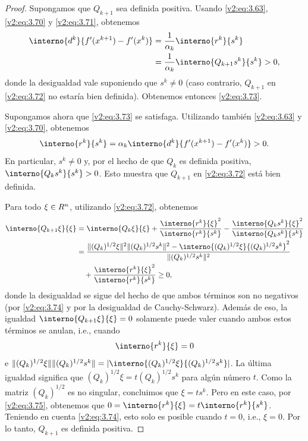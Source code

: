 \begin{proof}
    Supongamos que $Q_{k+1}$ sea definida positiva. Usando \eqref{v2:eq:3.63}, \eqref{v2:eq:3.70} y \eqref{v2:eq:3.71}, obtenemos
    \begin{align*}
        \interno{d^k}{f'(x^{k+1}) - f'(x^k)} &= \frac{1}{\alpha_k} \interno{r^k}{s^k} \\
        &= \frac{1}{\alpha_k} \interno{Q_{k+1} s^k}{s^k} > 0,
    \end{align*}
    donde la desigualdad vale suponiendo que $s^k \neq 0$ (caso contrario, $Q_{k+1}$ en \eqref{v2:eq:3.72} no estaría bien definida). Obtenemos entonces \eqref{v2:eq:3.73}.
    
    Supongamos ahora que \eqref{v2:eq:3.73} se satisfaga. Utilizando también \eqref{v2:eq:3.63} y \eqref{v2:eq:3.70}, obtenemos
    \begin{equation}
        \interno{r^k}{s^k} = \alpha_k \interno{d^k}{f'(x^{k+1}) - f'(x^k)} > 0.
        \label{v2:eq:3.74}
    \end{equation}
    En particular, $s^k \neq 0$ y, por el hecho de que $Q_k$ es definida positiva, $\interno{Q_k s^k}{s^k} > 0$. Esto muestra que $Q_{k+1}$ en \eqref{v2:eq:3.72} está bien definida.
    
    Para todo $\xi \in R^n$, utilizando \eqref{v2:eq:3.72}, obtenemos
    \begin{align*}
        \interno{Q_{k+1}\xi}{\xi} &= \interno{Q_k \xi}{\xi} + \frac{\interno{r^k}{\xi}^2}{\interno{r^k}{s^k}} - \frac{\interno{Q_k s^k}{\xi}^2}{\interno{Q_k s^k}{s^k}} \\
        &= \frac{\|(Q_k)^{1/2}\xi\|^2 \|(Q_k)^{1/2}s^k\|^2 - \interno{(Q_k)^{1/2}\xi}{(Q_k)^{1/2}s^k}^2}{\|(Q_k)^{1/2}s^k\|^2} \\
        &\quad + \frac{\interno{r^k}{\xi}^2}{\interno{r^k}{s^k}} \ge 0,
    \end{align*}
    donde la desigualdad se sigue del hecho de que ambos términos son no negativos (por \eqref{v2:eq:3.74} y por la desigualdad de Cauchy-Schwarz). Además de eso, la igualdad $\interno{Q_{k+1}\xi}{\xi} = 0$ solamente puede valer cuando ambos estos términos se anulan, i.e., cuando
    \begin{equation}
        \interno{r^k}{\xi} = 0
        \label{v2:eq:3.75}
    \end{equation}
    e $\|(Q_k)^{1/2}\xi\| \|(Q_k)^{1/2}s^k\| = |\interno{(Q_k)^{1/2}\xi}{(Q_k)^{1/2}s^k}|$. La última igualdad significa que $(Q_k)^{1/2}\xi = t(Q_k)^{1/2}s^k$ para algún número $t$. Como la matriz $(Q_k)^{1/2}$ es no singular, concluimos que $\xi = t s^k$. Pero en este caso, por \eqref{v2:eq:3.75}, obtenemos que $0 = \interno{r^k}{\xi} = t \interno{r^k}{s^k}$. Teniendo en cuenta \eqref{v2:eq:3.74}, esto solo es posible cuando $t = 0$, i.e., $\xi = 0$. Por lo tanto, $Q_{k+1}$ es definida positiva.
\end{proof}

